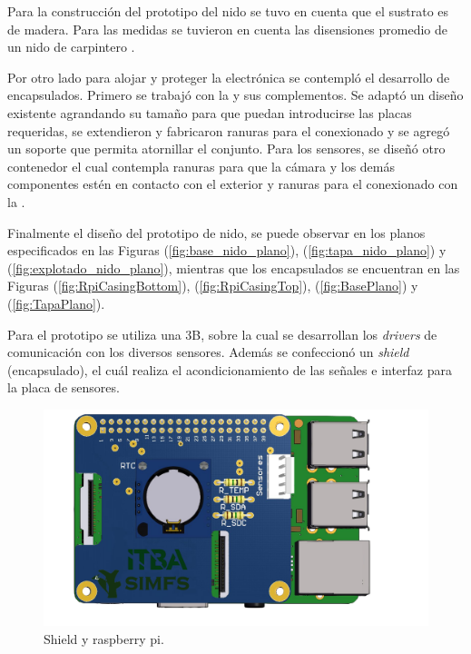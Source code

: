 Para la construcción del prototipo del nido se tuvo en cuenta que el sustrato es de madera. Para las medidas se tuvieron en cuenta las disensiones promedio de un nido de carpintero \cite{ref:PaperValeriaOjeda}.

Por otro lado para alojar y proteger la electrónica se contempló el desarrollo de encapsulados. Primero se trabajó con la \rspi y sus complementos. Se adaptó un diseño existente agrandando su tamaño para que puedan introducirse las placas requeridas, se extendieron y fabricaron ranuras para el conexionado y se agregó un soporte que permita atornillar el conjunto. Para los sensores, se diseñó otro contenedor el cual contempla ranuras para que la cámara y los demás componentes estén en contacto con el exterior y ranuras para el conexionado con la \rpi.

Finalmente el diseño del prototipo de nido, se puede observar en los planos especificados en las Figuras (\ref{fig:base_nido_plano}), (\ref{fig:tapa_nido_plano}) y (\ref{fig:explotado_nido_plano}), mientras que los encapsulados se encuentran en las Figuras (\ref{fig:RpiCasingBottom}), (\ref{fig:RpiCasingTop}), (\ref{fig:BasePlano}) y (\ref{fig:TapaPlano}).


\Subsubsection{\rspi}
Para el prototipo se utiliza una \rspi 3B, sobre la cual se desarrollan los \textit{drivers} de comunicación con los diversos sensores. Además se confeccionó un \textit{shield} (encapsulado), el cuál realiza el acondicionamiento de las señales e interfaz para la placa de sensores.
\begin{figure}[H]
	\centering
	\includegraphics[width=0.9\linewidth,page=1]{ImagenesConstruccion del prototipo/shieldSensor}		
	\caption{Shield  y raspberry pi.}
	\label{fig:shield}
\end{figure}

